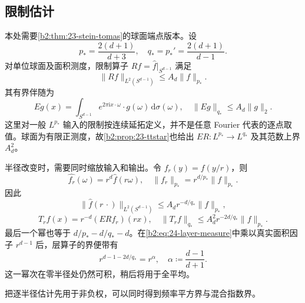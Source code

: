 \subsection{限制估计}
\label{b2:subsec:240402}

本处需要\cref{b2:thm:23-stein-tomas}的球面端点版本。设
\[
 p_*=\frac{2(d+1)}{d+3},\quad
 q_*=p_*'=\frac{2(d+1)}{d-1}.
\]
对单位球面及面积测度，限制算子 \(Rf=\widehat f|_{S^{d-1}}\) 满足
\[
 \|Rf\|_{L^2(S^{d-1})}\leq A_d\|f\|_{p_*}.
\]
其有界伴随为
\[
 Eg(x)=\int_{S^{d-1}}e^{2\pi\mathrm i x\cdot\omega}
        \cdot g(\omega)\,\mathrm d\sigma(\omega),\quad
 \|Eg\|_{q_*}\leq A_d\|g\|_2.
\]
这里对一般 \(L^{p_*}\) 输入的限制按连续延拓定义，并不是任意 Fourier 代表的逐点取值。球面为有限正测度，故\cref{b2:prop:23-ttstar}也给出 \(ER:L^{p_*}\to L^{q_*}\) 及其范数上界 \(A_d^2\)。

\ProseParagraphBreak
半径改变时，需要同时缩放输入和输出。令 \(f_r(y)=f(y/r)\)，则
\[
 \widehat{f_r}(\omega)=r^d\widehat f(r\omega),\quad
 \|f_r\|_{p_*}=r^{d/p_*}\|f\|_{p_*}.
\]
因此
\[
 \|\widehat f(r\,\cdot)\|_{L^2(S^{d-1})}
 \leq A_dr^{-d/q_*}\|f\|_{p_*},
\]
\[
 T_rf(x)=r^{-d}(ERf_r)(rx),\quad
 \|T_rf\|_{q_*}
 \leq A_d^2r^{-2d/q_*}\|f\|_{p_*}.
\]
最后一个幂也等于 \(d/p_*-d/q_*-d\)。在\eqref{b2:eq:24-layer-measure}中乘以真实面积因子 \(r^{d-1}\) 后，层算子的界便带有
\[
 r^{d-1-2d/q_*}=r^\alpha,\quad
 \alpha\coloneqq\frac{d-1}{d+1}.
\]
这一幂次在零半径处仍然可积，稍后将用于全平均。

\ProseParagraphBreak
把逐半径估计先用于非负权，可以同时得到频率平方界与混合指数界。

